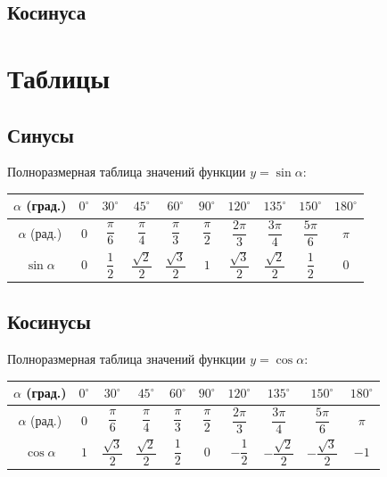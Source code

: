 \documentclass[11pt, latterpaper]{article}
\begin{document}
\subsection{Косинуса}
\begin{center}
\end{center}

\section{Таблицы}

\subsection{Синусы}
Полноразмерная таблица значений функции $y = \sin \alpha$:
\begin{center}
\renewcommand{\arraystretch}{2} %
\begin{tabular}{|c|c|c|c|c|c|c|c|c|c|}
\hline
$\alpha$ (град.) & $0^\circ$ & $30^\circ$ & $45^\circ$ & $60^\circ$ & $90^\circ$ & $120^\circ$ & $135^\circ$ & $150^\circ$ & $180^\circ$ \\ \hline
$\alpha$ (рад.)  & $0$ & $\dfrac{\pi}{6}$ & $\dfrac{\pi}{4}$ & $\dfrac{\pi}{3}$ & $\dfrac{\pi}{2}$ & $\dfrac{2\pi}{3}$ & $\dfrac{3\pi}{4}$ & $\dfrac{5\pi}{6}$ & $\pi$ \\ \hline
$\sin \alpha$   & $0$ & $\dfrac{1}{2}$ & $\dfrac{\sqrt{2}}{2}$ & $\dfrac{\sqrt{3}}{2}$ & $1$ & $\dfrac{\sqrt{3}}{2}$ & $\dfrac{\sqrt{2}}{2}$ & $\dfrac{1}{2}$ & $0$ \\ \hline
\end{tabular}
\end{center}

\subsection{Косинусы}
Полноразмерная таблица значений функции $y = \cos \alpha$:
\begin{center}
\renewcommand{\arraystretch}{2}
\begin{tabular}{|c|c|c|c|c|c|c|c|c|c|}
\hline
$\alpha$ (град.) & $0^\circ$ & $30^\circ$ & $45^\circ$ & $60^\circ$ & $90^\circ$ & $120^\circ$ & $135^\circ$ & $150^\circ$ & $180^\circ$ \\ \hline
$\alpha$ (рад.)  & $0$ & $\dfrac{\pi}{6}$ & $\dfrac{\pi}{4}$ & $\dfrac{\pi}{3}$ & $\dfrac{\pi}{2}$ & $\dfrac{2\pi}{3}$ & $\dfrac{3\pi}{4}$ & $\dfrac{5\pi}{6}$ & $\pi$ \\ \hline
$\cos \alpha$   & $1$ & $\dfrac{\sqrt{3}}{2}$ & $\dfrac{\sqrt{2}}{2}$ & $\dfrac{1}{2}$ & $0$ & $-\dfrac{1}{2}$ & $-\dfrac{\sqrt{2}}{2}$ & $-\dfrac{\sqrt{3}}{2}$ & $-1$ \\ \hline
\end{tabular}
\end{center}
\end{document}
